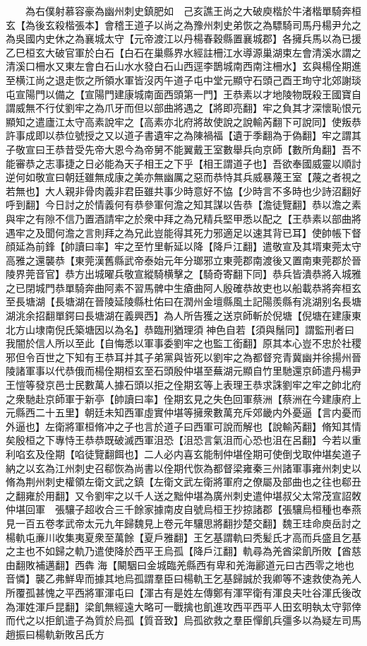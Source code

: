　　為右僕射慕容豪為幽州刺史鎮肥如　己亥譙王尚之大破庾楷於牛渚楷單騎奔桓玄【為後玄殺楷張本】會稽王道子以尚之為豫州刺史弟恢之為驃騎司馬丹楊尹允之為吳國内史休之為襄城太守【元帝渡江以丹楊春穀縣置襄城郡】各擁兵馬以為已援乙巳桓玄大破官軍於白石【白石在巢縣界水經註柵江水導源巢湖束左會清溪水謂之清溪口柵水又東左會白石山水水發白石山西逕李鵲城南西南注柵水】玄與楊佺期進至横江尚之退走恢之所領水軍皆沒丙午道子屯中堂元顯守石頭己酉王珣守北郊謝琰屯宣陽門以備之【宣陽門建康城南面西頭第一門】王恭素以才地陵物既殺王國寶自謂威無不行仗劉牢之為爪牙而但以部曲將遇之【將即亮翻】牢之負其才深懷恥恨元顯知之遣廬江太守高素說牢之【高素亦北府將故使說之說輸芮翻下可說同】使叛恭許事成即以恭位號授之又以道子書遺牢之為陳禍福【遺于季翻為于偽翻】牢之謂其子敬宣曰王恭昔受先帝大恩今為帝舅不能翼戴王室數舉兵向京師【數所角翻】吾不能審恭之志事捷之日必能為天子相王之下乎【相王謂道子也】吾欲奉國威靈以順討逆何如敬宣曰朝廷雖無成康之美亦無幽厲之惡而恭恃其兵威暴蔑王室【蔑之者視之若無也】大人親非骨肉義非君臣雖共事少時意好不恊【少時言不多時也少詩沼翻好呼到翻】今日討之於情義何有恭參軍何澹之知其謀以告恭【澹徒覽翻】恭以澹之素與牢之有隙不信乃置酒請牢之於衆中拜之為兄精兵堅甲悉以配之【王恭素以部曲將遇牢之及聞何澹之言則拜之為兄此豈能得其死力邪適足以速其背已耳】使帥帳下督顔延為前鋒【帥讀曰率】牢之至竹里斬延以降【降戶江翻】遣敬宣及其壻東莞太守高雅之還襲恭【東莞漢舊縣武帝泰始元年分瑯邪立東莞郡南渡後又置南東莞郡於晉陵界莞音官】恭方出城曜兵敬宣縱騎横擊之【騎奇寄翻下同】恭兵皆潰恭將入城雅之已閉城門恭單騎奔曲阿素不習馬髀中生瘡曲阿人殷確恭故吏也以船載恭將奔桓玄至長塘湖【長塘湖在晉陵延陵縣杜佑曰在潤州金壇縣風土記陽羨縣有洮湖别名長塘湖洮余招翻單鍔曰長塘湖在義興西】為人所告獲之送京師斬於倪塘【倪塘在建康東北方山埭南倪氏築塘因以為名】恭臨刑猶理須神色自若【須與鬚同】謂監刑者曰我闇於信人所以至此【自悔悉以軍事委劉牢之也監工銜翻】原其本心豈不忠於社稷邪但令百世之下知有王恭耳并其子弟黨與皆死以劉牢之為都督兖青冀幽并徐揚州晉陵諸軍事以代恭俄而楊佺期桓玄至石頭殷仲堪至蕪湖元顯自竹里馳還京師遣丹楊尹王愷等發京邑士民數萬人據石頭以拒之佺期玄等上表理王恭求誅劉牢之牢之帥北府之衆馳赴京師軍于新亭【帥讀曰率】佺期玄見之失色回軍蔡洲【蔡洲在今建康府上元縣西二十五里】朝廷未知西軍虛實仲堪等擁衆數萬充斥郊畿内外憂逼【言内憂而外逼也】左衛將軍桓脩冲之子也言於道子曰西軍可說而解也【說輸芮翻】脩知其情矣殷桓之下專恃王恭恭既破滅西軍沮恐【沮恐言氣沮而心恐也沮在呂翻】今若以重利啗玄及佺期【啗徒覽翻餌也】二人必内喜玄能制仲堪佺期可使倒戈取仲堪矣道子納之以玄為江州刺史召郗恢為尚書以佺期代恢為都督梁雍秦三州諸軍事雍州刺史以脩為荆州刺史權領左衛文武之鎮【左衛文武左衛將軍府之僚屬及部曲也之往也郗丑之翻雍於用翻】又令劉牢之以千人送之黜仲堪為廣州刺史遣仲堪叔父太常茂宣詔敇仲堪回軍　張驤子超收合三千餘家據南皮自號烏桓王抄掠諸郡【張驤烏桓種也奉燕見一百五卷孝武帝太元九年歸魏見上卷元年驤思將翻抄楚交翻】魏王珪命庾岳討之　楊軌屯亷川收集夷夏衆至萬餘【夏戶雅翻】王乞基謂軌曰秃髪氏才高而兵盛且乞基之主也不如歸之軌乃遣使降於西平王烏孤【降戶江翻】軌尋為羌酋梁飢所敗【酋慈由翻敗補邁翻】西犇海【闞駰曰金城臨羌縣西有卑和羌海酈道元曰古西零之地也音憐】襲乙弗鮮卑而據其地烏孤謂羣臣曰楊軌王乞基歸誠於我卿等不速救使為羌人所覆孤甚愧之平西將軍渾屯曰【渾古有是姓左傳鄭有渾罕衛有渾良夫吐谷渾氏後改為渾姓渾戶昆翻】梁飢無經遠大略可一戰擒也飢進攻西平西平人田玄明執太守郭倖而代之以拒飢遣子為質於烏孤【質音致】烏孤欲救之羣臣憚飢兵彊多以為疑左司馬趙振曰楊軌新敗呂氏方